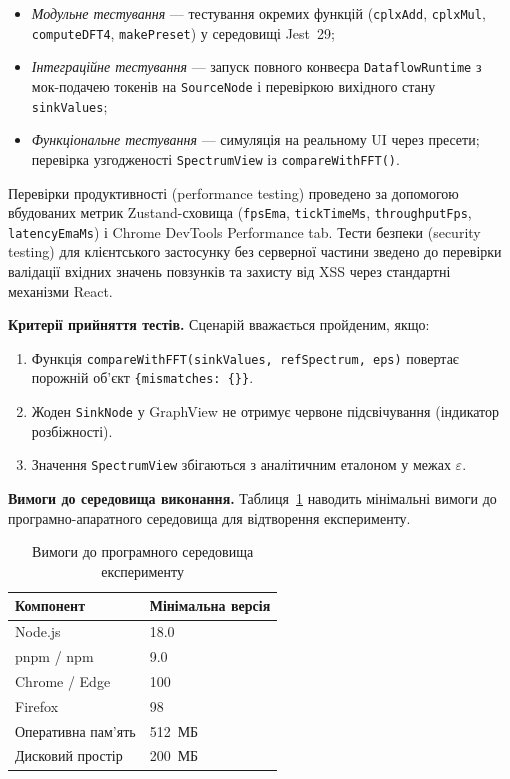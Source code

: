\begin{itemize}
  \item \emph{Модульне тестування} --- тестування окремих функцій
    (\texttt{cplxAdd}, \texttt{cplxMul}, \texttt{computeDFT4},
    \texttt{makePreset}) у середовищі Jest~29;
  \item \emph{Інтеграційне тестування} --- запуск повного конвеєра
    \texttt{DataflowRuntime} з мок-подачею токенів на \texttt{SourceNode}
    і перевіркою вихідного стану \texttt{sinkValues};
  \item \emph{Функціональне тестування} --- симуляція на реальному UI
    через пресети; перевірка узгодженості \texttt{SpectrumView} із
    \texttt{compareWithFFT()}.
\end{itemize}

Перевірки продуктивності (performance testing) проведено за допомогою
вбудованих метрик Zustand-сховища (\texttt{fpsEma}, \texttt{tickTimeMs},
\texttt{throughputFps}, \texttt{latencyEmaMs}) і Chrome DevTools
Performance tab. Тести безпеки (security testing) для клієнтського
застосунку без серверної частини зведено до перевірки валідації вхідних
значень повзунків та захисту від XSS через стандартні механізми React.

\textbf{Критерії прийняття тестів.} Сценарій вважається пройденим, якщо:

\begin{enumerate}
  \item Функція \texttt{compareWithFFT(sinkValues, refSpectrum, eps)}
    повертає порожній об'єкт \texttt{\{mismatches: \{\}\}}.
  \item Жоден \texttt{SinkNode} у GraphView не отримує червоне
    підсвічування (індикатор розбіжності).
  \item Значення \texttt{SpectrumView} збігаються з аналітичним
    еталоном у межах $\varepsilon$.
\end{enumerate}

\textbf{Вимоги до середовища виконання.} Таблиця~\ref{tab:requirements}
наводить мінімальні вимоги до програмно-апаратного середовища для
відтворення експерименту.

\begin{table}[H]
  \caption{Вимоги до програмного середовища експерименту}
  \label{tab:requirements}
  \centering
  \begin{tabular}{ll}
    \toprule
    Компонент & Мінімальна версія \\
    \midrule
    Node.js    & 18.0 \\
    pnpm / npm & 9.0  \\
    Chrome / Edge & 100 \\
    Firefox    & 98 \\
    Оперативна пам'ять & 512~МБ \\
    Дисковий простір & 200~МБ \\
    \bottomrule
  \end{tabular}
\end{table}

